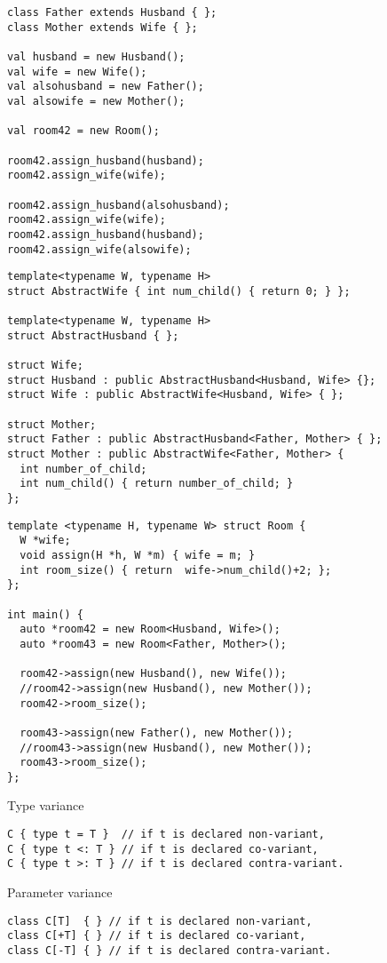 \documentclass{beamer}
\begin{document}
\begin{frame}[fragile]{}
\begin{verbatim}
class Father extends Husband { };
class Mother extends Wife { };

val husband = new Husband();
val wife = new Wife();
val alsohusband = new Father();
val alsowife = new Mother();

val room42 = new Room();

room42.assign_husband(husband);
room42.assign_wife(wife);

room42.assign_husband(alsohusband);
room42.assign_wife(wife);
room42.assign_husband(husband);
room42.assign_wife(alsowife);
\end{verbatim}
\end{frame}

\begin{frame}[fragile]{}
\begin{verbatim}
template<typename W, typename H>
struct AbstractWife { int num_child() { return 0; } };

template<typename W, typename H>
struct AbstractHusband { };

struct Wife;
struct Husband : public AbstractHusband<Husband, Wife> {};
struct Wife : public AbstractWife<Husband, Wife> { };

struct Mother;
struct Father : public AbstractHusband<Father, Mother> { };
struct Mother : public AbstractWife<Father, Mother> {
  int number_of_child;
  int num_child() { return number_of_child; }
};
\end{verbatim}
\end{frame}

\begin{frame}[fragile]{}
\begin{verbatim}
template <typename H, typename W> struct Room {
  W *wife;
  void assign(H *h, W *m) { wife = m; }
  int room_size() { return  wife->num_child()+2; };
};

int main() {
  auto *room42 = new Room<Husband, Wife>();
  auto *room43 = new Room<Father, Mother>();

  room42->assign(new Husband(), new Wife());
  //room42->assign(new Husband(), new Mother());
  room42->room_size();

  room43->assign(new Father(), new Mother());
  //room43->assign(new Husband(), new Mother());
  room43->room_size();
};
\end{verbatim}
\end{frame}

\begin{frame}[fragile]{}
Type variance
\begin{verbatim}
C { type t = T }  // if t is declared non-variant,
C { type t <: T } // if t is declared co-variant,
C { type t >: T } // if t is declared contra-variant.
\end{verbatim}
Parameter variance
\begin{verbatim}
class C[T]  { } // if t is declared non-variant,
class C[+T] { } // if t is declared co-variant,
class C[-T] { } // if t is declared contra-variant.
\end{verbatim}
\end{frame}
\end{document}
